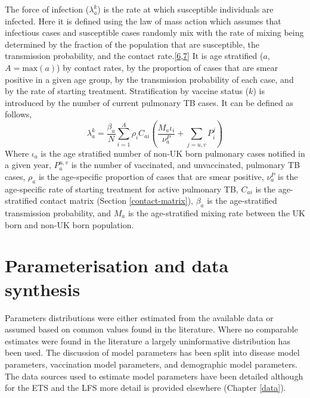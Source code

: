 \documentclass[11pt,twoside]{bristolthesis}
\begin{document}
  The force of infection (\(\lambda^k_a\)) is the rate at which susceptible individuals are infected. Here it is defined using the law of mass action which assumes that infectious cases and susceptible cases randomly mix with the rate of mixing being determined by the fraction of the population that are susceptible, the transmission probability, and the contact rate.{[}\protect\hyperlink{ref-Anderson1991}{6},\protect\hyperlink{ref-Keeling2007}{7}{]} It is age stratified (\(a\), \(A = \text{max}(a)\)) by contact rates, by the proportion of cases that are smear positive in a given age group, by the transmission probability of each case, and by the rate of starting treatment. Stratification by vaccine status (\(k\)) is introduced by the number of current pulmonary TB cases. It can be defined as follows,
  \begin{equation}
  \lambda^k_a = \frac{\beta_a}{N} \sum\limits_{i=1}^{A} \rho_i C_{ai}\left(\frac{M_{a}\iota_i}{\nu_a^P} + \sum\limits_{j = u,v}P^j_i\right)
    \label{eq:force-of-infection}
  \end{equation}
  Where \(\iota_a\) is the age stratified number of non-UK born pulmonary cases notified in a given year, \(P^{u,v}_a\) is the number of vaccinated, and unvaccinated, pulmonary TB cases, \(\rho_a\) is the age-specific proportion of cases that are smear positive, \(\nu^P_a\) is the age-specific rate of starting treatment for active pulmonary TB, \(C_{ai}\) is the age-stratified contact matrix (Section \ref{contact-matrix}), \(\beta_a\) is the age-stratified transmission probability, and \(M_a\) is the age-stratified mixing rate between the UK born and non-UK born population.
  
  \hypertarget{parameterisation-and-data-synthesis}{%
  \section{Parameterisation and data synthesis}\label{parameterisation-and-data-synthesis}}
  
  Parameters distributions were either estimated from the available data or assumed based on common values found in the literature. Where no comparable estimates were found in the literature a largely uninformative distribution has been used. The discussion of model parameters has been split into disease model parameters, vaccination model parameters, and demographic model parameters. The data sources used to estimate model parameters have been detailed although for the ETS and the LFS more detail is provided elsewhere (Chapter \ref{data}).
  
\end{document}
